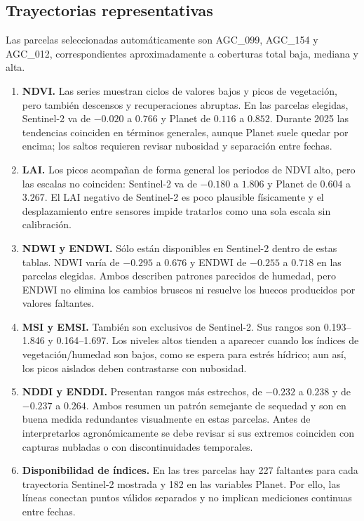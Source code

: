 ﻿\documentclass[11pt,a4paper]{article}
\begin{document}
\subsection{Trayectorias representativas}
Las parcelas seleccionadas automáticamente son AGC\_099, AGC\_154 y AGC\_012,
correspondientes aproximadamente a coberturas total baja, mediana y alta.
\begin{enumerate}[resume]
  \item \textbf{NDVI.} Las series muestran ciclos de valores bajos y picos de
  vegetación, pero también descensos y recuperaciones abruptas. En las parcelas
  elegidas, Sentinel-2 va de $-0.020$ a $0.766$ y Planet de $0.116$ a $0.852$.
  Durante 2025 las tendencias coinciden en términos generales, aunque Planet
  suele quedar por encima; los saltos requieren revisar nubosidad y separación
  entre fechas.

  \item \textbf{LAI.} Los picos acompañan de forma general los periodos de NDVI
  alto, pero las escalas no coinciden: Sentinel-2 va de $-0.180$ a $1.806$ y
  Planet de $0.604$ a $3.267$. El LAI negativo de Sentinel-2 es poco plausible
  físicamente y el desplazamiento entre sensores impide tratarlos como una sola
  escala sin calibración.

  \item \textbf{NDWI y ENDWI.} Sólo están disponibles en Sentinel-2 dentro de
  estas tablas. NDWI varía de $-0.295$ a $0.676$ y ENDWI de $-0.255$ a $0.718$
  en las parcelas elegidas. Ambos describen patrones parecidos de humedad, pero
  ENDWI no elimina los cambios bruscos ni resuelve los huecos producidos por
  valores faltantes.

  \item \textbf{MSI y EMSI.} También son exclusivos de Sentinel-2. Sus rangos
  son 0.193--1.846 y 0.164--1.697. Los niveles altos tienden a aparecer cuando
  los índices de vegetación/humedad son bajos, como se espera para estrés
  hídrico; aun así, los picos aislados deben contrastarse con nubosidad.

  \item \textbf{NDDI y ENDDI.} Presentan rangos más estrechos, de
  $-0.232$ a $0.238$ y de $-0.237$ a $0.264$. Ambos resumen un patrón semejante
  de sequedad y son en buena medida redundantes visualmente en estas parcelas.
  Antes de interpretarlos agronómicamente se debe revisar si sus extremos
  coinciden con capturas nubladas o con discontinuidades temporales.

  \item \textbf{Disponibilidad de índices.} En las tres parcelas hay 227
  faltantes para cada trayectoria Sentinel-2 mostrada y 182 en las variables
  Planet. Por ello, las líneas conectan puntos válidos separados y no implican
  mediciones continuas entre fechas.
\end{enumerate}
\end{document}
